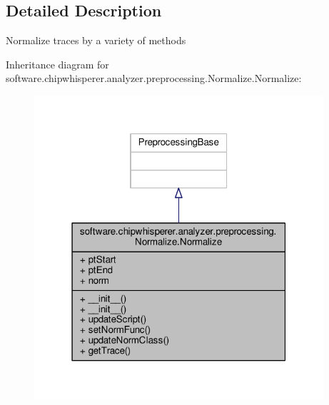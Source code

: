 \subsection{Detailed Description}
\begin{DoxyVerb}Normalize traces by a variety of methods
\end{DoxyVerb}
 

Inheritance diagram for software.\+chipwhisperer.\+analyzer.\+preprocessing.\+Normalize.\+Normalize\+:\nopagebreak
\begin{figure}[H]
\begin{center}
\leavevmode
\includegraphics[width=304pt]{d1/dff/classsoftware_1_1chipwhisperer_1_1analyzer_1_1preprocessing_1_1Normalize_1_1Normalize__inherit__graph}
\end{center}
\end{figure}


